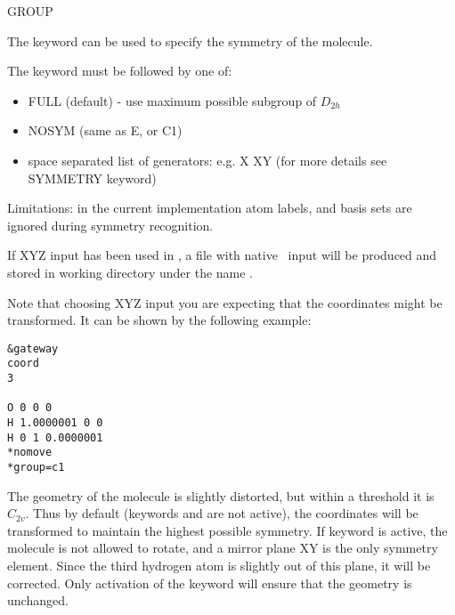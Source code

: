 \begin{keywordlist}
\item[GROUP]

The keyword can be used to specify the symmetry of the molecule.

The keyword must be followed by one of:
\begin{itemize}
\item FULL (default) - use maximum possible subgroup of $D_{2h}$
\item NOSYM (same as E, or C1)
\item space separated list of generators: e.g. X XY (for more details see SYMMETRY keyword)
\end{itemize}

Limitations: in the current implementation atom labels, and basis sets are ignored
during symmetry recognition.

\end{keywordlist}

If XYZ input has been used in , a file with native \molcas\ input will be
produced and stored in working directory under the name .

Note that choosing XYZ input you are expecting that the coordinates might be transformed. 
It can be shown by the following example:

\begin{verbatim}
&gateway
coord
3

O 0 0 0
H 1.0000001 0 0
H 0 1 0.0000001
*nomove
*group=c1
\end{verbatim}

The geometry of the molecule is slightly distorted, but within a threshold it is $C_{2v}$. 
Thus by default (keywords  and  are not active), the 
coordinates will be transformed to maintain the highest possible symmetry. 
If keyword  is active, the molecule is not allowed to rotate, and 
a mirror plane XY is the only symmetry element. Since the third hydrogen atom is 
slightly out of this plane, it will be corrected. Only activation of the keyword 
will ensure that the geometry is unchanged. 

